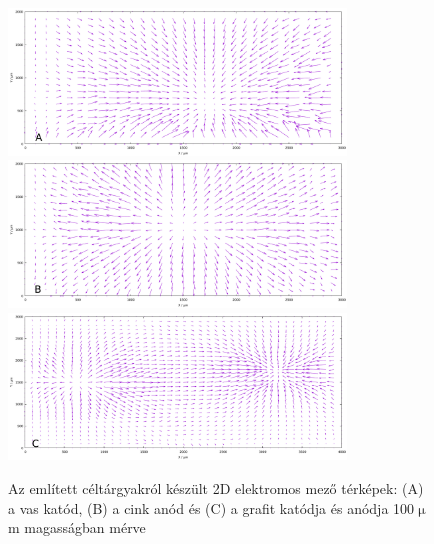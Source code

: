 \begin{figure}
\centering
\includegraphics[width=0.8\textwidth]{img/mérések/Fe1_h100.pdf}
\includegraphics[width=0.8\textwidth]{img/mérések/Zn1_h100.pdf}
\includegraphics[width=0.8\textwidth]{img/mérések/grafit1_h100.pdf}

\caption{Az említett céltárgyakról készült 2D elektromos mező térképek:
(A) a vas katód, (B) a cink anód és (C) a grafit katódja és anódja 100$\upmu$m magasságban mérve}
\label{fig:field_h1}
\end{figure}

